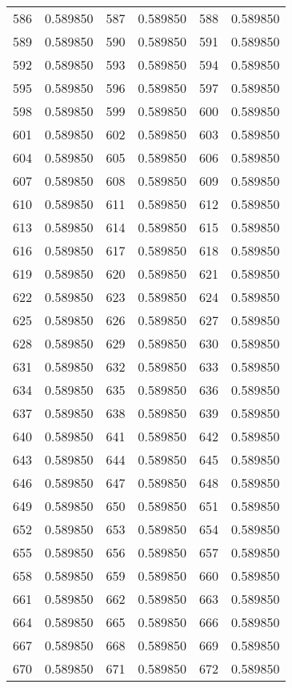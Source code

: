 \documentclass[12pt]{article}
\begin{document}
\begin{longtable}{@{}cc|cc|cc@{}}
586 & 0.589850 & 587 & 0.589850 & 588 & 0.589850 \\
589 & 0.589850 & 590 & 0.589850 & 591 & 0.589850 \\
592 & 0.589850 & 593 & 0.589850 & 594 & 0.589850 \\
595 & 0.589850 & 596 & 0.589850 & 597 & 0.589850 \\
598 & 0.589850 & 599 & 0.589850 & 600 & 0.589850 \\
601 & 0.589850 & 602 & 0.589850 & 603 & 0.589850 \\
604 & 0.589850 & 605 & 0.589850 & 606 & 0.589850 \\
607 & 0.589850 & 608 & 0.589850 & 609 & 0.589850 \\
610 & 0.589850 & 611 & 0.589850 & 612 & 0.589850 \\
613 & 0.589850 & 614 & 0.589850 & 615 & 0.589850 \\
616 & 0.589850 & 617 & 0.589850 & 618 & 0.589850 \\
619 & 0.589850 & 620 & 0.589850 & 621 & 0.589850 \\
622 & 0.589850 & 623 & 0.589850 & 624 & 0.589850 \\
625 & 0.589850 & 626 & 0.589850 & 627 & 0.589850 \\
628 & 0.589850 & 629 & 0.589850 & 630 & 0.589850 \\
631 & 0.589850 & 632 & 0.589850 & 633 & 0.589850 \\
634 & 0.589850 & 635 & 0.589850 & 636 & 0.589850 \\
637 & 0.589850 & 638 & 0.589850 & 639 & 0.589850 \\
640 & 0.589850 & 641 & 0.589850 & 642 & 0.589850 \\
643 & 0.589850 & 644 & 0.589850 & 645 & 0.589850 \\
646 & 0.589850 & 647 & 0.589850 & 648 & 0.589850 \\
649 & 0.589850 & 650 & 0.589850 & 651 & 0.589850 \\
652 & 0.589850 & 653 & 0.589850 & 654 & 0.589850 \\
655 & 0.589850 & 656 & 0.589850 & 657 & 0.589850 \\
658 & 0.589850 & 659 & 0.589850 & 660 & 0.589850 \\
661 & 0.589850 & 662 & 0.589850 & 663 & 0.589850 \\
664 & 0.589850 & 665 & 0.589850 & 666 & 0.589850 \\
667 & 0.589850 & 668 & 0.589850 & 669 & 0.589850 \\
670 & 0.589850 & 671 & 0.589850 & 672 & 0.589850 \\

\end{longtable}
\end{document}
